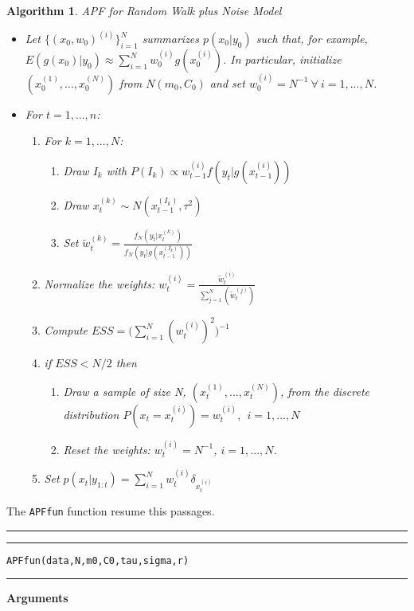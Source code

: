 \documentclass[
]{article}
\newtheorem{algorithm}{Algorithm}[section]
\begin{document}
\begin{algorithm} APF for Random Walk plus Noise Model
\begin{itemize}
\item Let $\{(x_{0},w_{0})^{(i)}\}_{i=1}^{N}$ summarizes $p(x_{0}|y_{0})$ such that, for example, $E(g(x_{0})|y_{0}) \approx \sum_{i=1}^{N}w_{0}^{(i)}g(x_{0}^{(i)})$. In particular, initialize $(x_{0}^{(1)},...,x_{0}^{(N)})$ from $N(m_{0},C_{0})$ and set $w_{0}^{(i)}=N^{-1} \ \forall \ i=1,...,N$.
\item For $t=1,...,n$:
\begin{enumerate}
\item For $k=1,...,N$:
\begin{enumerate}
\item Draw $I_{k}$ with $P(I_{k}) \propto w_{t-1}^{(i)}f(y_{t}|g(x_{t-1}^{(i)})) $
\item Draw $x_{t}^{(k)} \sim N(x_{t-1}^{(I_{k})},\tau^2)$
\item Set  $\tilde{w}_{t}^{(k)} = \frac{f_{N}(y_{t}|x_{t}^{(k)})}{f_{N}(y_{t}|g(x_{t-1}^{(I_{k})}))}$
\end{enumerate}
\item Normalize the weights: $w_{t}^{(i)}=\frac{\tilde{w}_{t}^{(i)}}{\sum_{j=1}^{N}(\tilde{w}_{t}^{(j)})}$
\item Compute $ESS=\Bigg(\sum_{i=1}^{N}(w_{t}^{(i)})^{2}\Bigg)^{-1}$
\item if $ESS<N/2$ then
\begin{enumerate}
\item Draw a sample of size N, $(x_{t}^{(1)},...,x_{t}^{(N)})$, from the discrete distribution $P(x_{t}=x_{t}^{(i)})=w_{t}^{(i)},\ \ i=1,...,N$
\item Reset the weights: $w_{t}^{(i)}=N^{-1}$, $i=1,...,N$.
\end{enumerate}
\item Set $p(x_{t}|y_{1:t})=\sum_{i=1}^{N}w_{t}^{(i)}\delta_{x_{t}^{(i)}}$
\end{enumerate}
\end{itemize}
\end{algorithm}

The \texttt{APFfun} function resume this passages.\\

\hrule
\hrule

\hfill\break
\texttt{APFfun(data,N,m0,C0,tau,sigma,r)}\\

\hrule

\textbf{Arguments}
\end{document}
